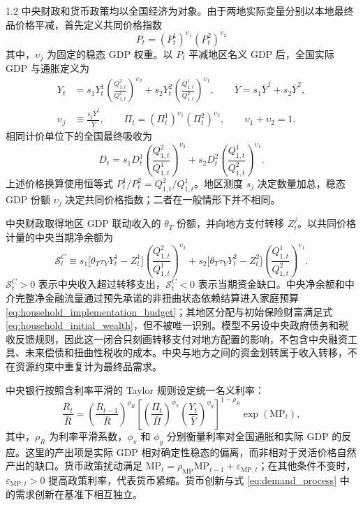 \documentclass[12pt,UTF8]{ctexart}
\newcommand{\MP}{\mathrm{MP}}
\begin{document}
\begin{spacing}{1.2}
		中央财政和货币政策均以全国经济为对象。由于两地实际变量分别以本地最终品价格平减，首先定义共同价格指数
		\begin{equation*}
			P_t=(P_t^1)^{\upsilon_1}(P_t^2)^{\upsilon_2}
		\end{equation*}
		其中，$\upsilon_j$ 为固定的稳态 GDP 权重。以 $P_t$ 平减地区名义 GDP 后，全国实际 GDP 与通胀定义为
		\begin{align}
			Y_t&=s_1Y_t^1
			\left(\frac{Q_{1,t}^2}{Q_{1,t}^1}\right)^{\upsilon_2}
			+s_2Y_t^2
			\left(\frac{Q_{1,t}^1}{Q_{1,t}^2}\right)^{\upsilon_1},
			\qquad \bar Y=s_1\bar Y^1+s_2\bar Y^2,
			\label{eq:gdp_aggregate}\\
			\upsilon_j&\equiv\frac{s_j\bar Y^j}{\bar Y},
			\qquad \Pi_t=(\Pi_t^1)^{\upsilon_1}(\Pi_t^2)^{\upsilon_2},
			\qquad \upsilon_1+\upsilon_2=1.
			\label{eq:inflation_aggregate}
		\end{align}
		相同计价单位下的全国最终吸收为
		\begin{equation}
			D_t=s_1D_t^1
			\left(\frac{Q_{1,t}^2}{Q_{1,t}^1}\right)^{\upsilon_2}
			+s_2D_t^2
			\left(\frac{Q_{1,t}^1}{Q_{1,t}^2}\right)^{\upsilon_1}.
			\label{eq:absorption_aggregate}
		\end{equation}
		上述价格换算使用恒等式 $P_t^1/P_t^2=Q_{1,t}^2/Q_{1,t}^1$。地区测度 $s_j$ 决定数量加总，稳态 GDP 份额 $\upsilon_j$ 决定共同价格指数；二者在一般情形下并不相同。
		
		中央财政取得地区 GDP 联动收入的 $\theta_T$ 份额，并向地方支付转移 $Z_t^j$。以共同价格计量的中央当期净余额为
		\begin{equation}
			\mathcal S_t^C\equiv
			s_1\bigl[\theta_T\tau_Y Y_t^1-Z_t^1\bigr]
			\left(\frac{Q_{1,t}^2}{Q_{1,t}^1}\right)^{\upsilon_2}
			+s_2\bigl[\theta_T\tau_Y Y_t^2-Z_t^2\bigr]
			\left(\frac{Q_{1,t}^1}{Q_{1,t}^2}\right)^{\upsilon_1}.
			\label{eq:central_residual}
		\end{equation}
		$\mathcal S_t^C>0$ 表示中央收入超过转移支出，$\mathcal S_t^C<0$ 表示当期资金缺口。中央净余额和中介完整净金融流量通过预先承诺的非扭曲状态依赖结算进入家庭预算 \eqref{eq:household_implementation_budget}；其地区分配与初始保险财富满足式 \eqref{eq:household_initial_wealth}，但不被唯一识别。模型不另设中央政府债务和税收反馈规则，因此这一闭合只刻画转移支付对地方配置的影响，不包含中央融资工具、未来偿债和扭曲性税收的成本。中央与地方之间的资金划转属于收入转移，不在资源约束中重复计为最终品需求。
		
		中央银行按照含利率平滑的 Taylor 规则设定统一名义利率：
		\begin{equation}
			\frac{R_t}{\bar R}
			=\left(\frac{R_{t-1}}{\bar R}\right)^{\rho_R}
			\left[
			\left(\frac{\Pi_t}{\bar\Pi}\right)^{\phi_\pi}
			\left(\frac{Y_t}{\bar Y}\right)^{\phi_y}
			\right]^{1-\rho_R}
			\exp(\MP_t),
			\label{eq:Taylor}
		\end{equation}
		其中，$\rho_R$ 为利率平滑系数，$\phi_\pi$ 和 $\phi_y$ 分别衡量利率对全国通胀和实际 GDP 的反应。这里的产出项是实际 GDP 相对确定性稳态的偏离，而非相对于灵活价格自然产出的缺口。货币政策扰动满足 $\MP_t=\rho_{\MP}\MP_{t-1}+\varepsilon_{\MP,t}$；在其他条件不变时，$\varepsilon_{\MP,t}>0$ 提高政策利率，代表货币紧缩。货币创新与式 \eqref{eq:demand_process} 中的需求创新在基准下相互独立。
		

\end{spacing}
\end{document}
